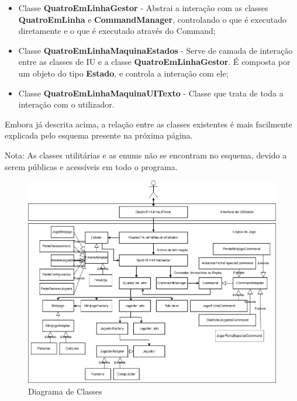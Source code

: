 \documentclass[11pt]{article}
\begin{document}
\begin{itemize}
		\item Classe \textbf{QuatroEmLinhaGestor} - Abstrai a interação com as classes \textbf{QuatroEmLinha} e \textbf{CommandManager}, controlando o que é executado diretamente e o que é executado através do Command;
		\item Classe \textbf{QuatroEmLinhaMaquinaEstados} - Serve de camada de interação entre as classes de IU e a classe \textbf{QuatroEmLinhaGestor}. É composta por um objeto do tipo \textbf{Estado}, e controla a interação com ele;
		\item Classe \textbf{QuatroEmLinhaMaquinaUITexto} - Classe que trata de toda a interação com o utilizador.
	\end{itemize}
	
	Embora já descrita acima, a relação entre as classes existentes é mais facilmente explicada pelo esquema presente na próxima página.
	
	\pagebreak
	
	Nota: As classes utilitárias e as enums não se encontram no esquema, devido a serem públicas e acessíveis em todo o programa.
	
	\vspace{0.5cm}
	
	\begin{figure}[h]
		\includegraphics[width=1\textwidth]{diagrama-classes}
		\centering
		\caption{Diagrama de Classes}
		\label{fig:diag-classes}
	\end{figure}

	\pagebreak
	
\end{document}
